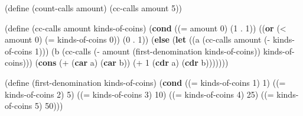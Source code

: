 \documentclass[
]{article}
\newenvironment{Shaded}{}{}
\newcommand{\DecValTok}[1]{\textcolor[rgb]{0.25,0.63,0.44}{#1}}
\newcommand{\ExtensionTok}[1]{#1}
\newcommand{\FunctionTok}[1]{\textcolor[rgb]{0.02,0.16,0.49}{#1}}
\newcommand{\KeywordTok}[1]{\textcolor[rgb]{0.00,0.44,0.13}{\textbf{#1}}}
\newcommand{\NormalTok}[1]{#1}
\newcommand{\OperatorTok}[1]{\textcolor[rgb]{0.40,0.40,0.40}{#1}}
\begin{document}
\hypertarget{cc-calls}{%
\label{cc-calls}}%
\begin{Shaded}
\begin{Highlighting}[numbers=left,,]
\NormalTok{(}\ExtensionTok{define}\FunctionTok{ }\NormalTok{(count{-}calls amount)}
\NormalTok{  (cc{-}calls amount }\DecValTok{5}\NormalTok{))}

\NormalTok{(}\ExtensionTok{define}\FunctionTok{ }\NormalTok{(cc{-}calls amount kinds{-}of{-}coins)}
\NormalTok{  (}\KeywordTok{cond}\NormalTok{ ((}\OperatorTok{=}\NormalTok{ amount }\DecValTok{0}\NormalTok{) \textquotesingle{}(}\DecValTok{1} \OperatorTok{.} \DecValTok{1}\NormalTok{))}
\NormalTok{        ((}\KeywordTok{or}\NormalTok{ (}\OperatorTok{\textless{}}\NormalTok{ amount }\DecValTok{0}\NormalTok{)}
\NormalTok{             (}\OperatorTok{=}\NormalTok{ kinds{-}of{-}coins }\DecValTok{0}\NormalTok{))}
\NormalTok{         \textquotesingle{}(}\DecValTok{0} \OperatorTok{.} \DecValTok{1}\NormalTok{))}
\NormalTok{        (}\KeywordTok{else}
\NormalTok{         (}\KeywordTok{let}\NormalTok{ ((a (cc{-}calls amount (}\OperatorTok{{-}}\NormalTok{ kinds{-}of{-}coins }\DecValTok{1}\NormalTok{)))}
\NormalTok{               (b (cc{-}calls (}\OperatorTok{{-}}\NormalTok{ amount (first{-}denomination}
\NormalTok{                                 kinds{-}of{-}coins))}
\NormalTok{                      kinds{-}of{-}coins)))}
\NormalTok{           (}\KeywordTok{cons}\NormalTok{ (}\OperatorTok{+}\NormalTok{ (}\KeywordTok{car}\NormalTok{ a)}
\NormalTok{                    (}\KeywordTok{car}\NormalTok{ b))}
\NormalTok{                 (}\OperatorTok{+} \DecValTok{1}
\NormalTok{                    (}\KeywordTok{cdr}\NormalTok{ a)}
\NormalTok{                    (}\KeywordTok{cdr}\NormalTok{ b)))))))}

\NormalTok{(}\ExtensionTok{define}\FunctionTok{ }\NormalTok{(first{-}denomination kinds{-}of{-}coins)}
\NormalTok{  (}\KeywordTok{cond}\NormalTok{ ((}\OperatorTok{=}\NormalTok{ kinds{-}of{-}coins }\DecValTok{1}\NormalTok{) }\DecValTok{1}\NormalTok{)}
\NormalTok{        ((}\OperatorTok{=}\NormalTok{ kinds{-}of{-}coins }\DecValTok{2}\NormalTok{) }\DecValTok{5}\NormalTok{)}
\NormalTok{        ((}\OperatorTok{=}\NormalTok{ kinds{-}of{-}coins }\DecValTok{3}\NormalTok{) }\DecValTok{10}\NormalTok{)}
\NormalTok{        ((}\OperatorTok{=}\NormalTok{ kinds{-}of{-}coins }\DecValTok{4}\NormalTok{) }\DecValTok{25}\NormalTok{)}
\NormalTok{        ((}\OperatorTok{=}\NormalTok{ kinds{-}of{-}coins }\DecValTok{5}\NormalTok{) }\DecValTok{50}\NormalTok{)))}
\end{Highlighting}
\end{Shaded}
\end{document}
